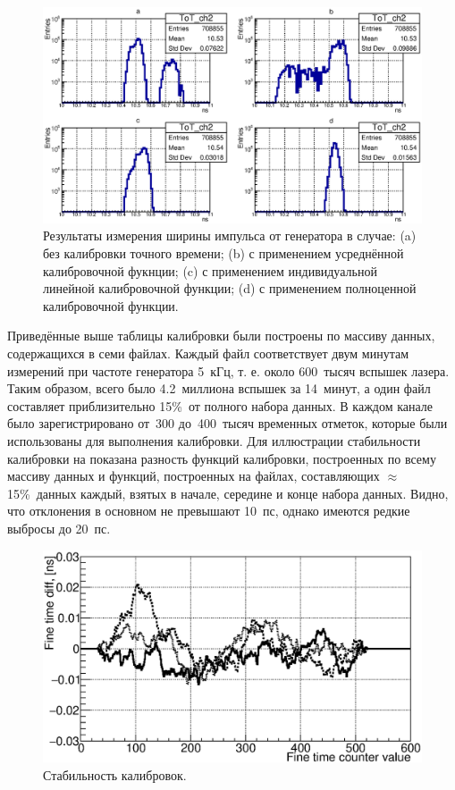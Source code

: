 \begin{figure}[H]
\centering
\includegraphics[width=1.0\textwidth]{pictures/20_ToT_ch2.eps}
\caption{Результаты измерения ширины импульса от генератора в случае: (a) без калибровки точного времени; (b) с применением усреднённой калибровочной фукнции; (c) с применением индивидуальной линейной калибровочной функции; (d) с применением полноценной калибровочной функции.}
\label{fig:FourToT}
\end{figure}

Приведённые выше таблицы калибровки были построены по массиву данных, содержащихся в семи файлах. Каждый файл соответствует двум минутам измерений при частоте генератора 5~кГц, т. е. около 600~тысяч вспышек лазера. Таким образом, всего было 4.2~миллиона вспышек за  14~минут, а один файл составляет приблизительно 15\%~от полного набора данных. В каждом канале было зарегистрировано от~300 до~400~тысяч временных отметок, которые были использованы для выполнения калибровки. Для иллюстрации стабильности калибровки на  показана разность функций калибровки, построенных по всему массиву данных и функций, построенных на файлах, составляющих $ \approx $15\%~данных каждый, взятых в начале, середине и конце набора данных. Видно, что отклонения в основном не превышают 10~пс, однако имеются редкие выбросы до 20~пс.

\begin{figure}[H]
\centering
\includegraphics[width=1.0\textwidth]{pictures/21_calibrationStability_feb2017.eps}
\caption{Стабильность калибровок.}
\label{fig:Stability}
\end{figure}
